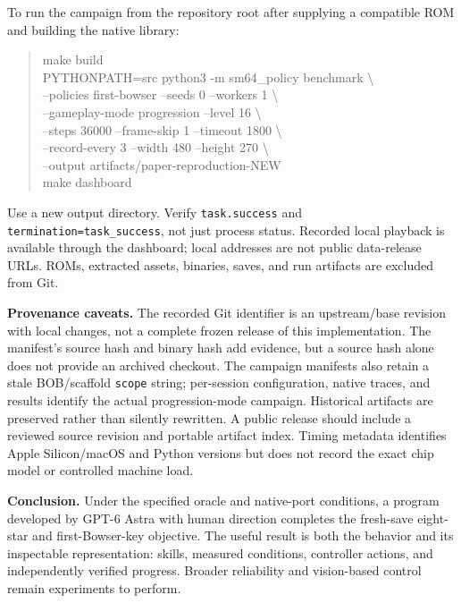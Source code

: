 \documentclass[10pt,letterpaper]{article}
\newcommand{\code}[1]{\texttt{#1}}
\begin{document}
To run the campaign from the repository root after supplying a compatible ROM and building the native library:
\begin{quote}\small\ttfamily
make build\\
PYTHONPATH=src python3 -m sm64\_policy benchmark \textbackslash\\
\hspace*{1em}--policies first-bowser --seeds 0 --workers 1 \textbackslash\\
\hspace*{1em}--gameplay-mode progression --level 16 \textbackslash\\
\hspace*{1em}--steps 36000 --frame-skip 1 --timeout 1800 \textbackslash\\
\hspace*{1em}--record-every 3 --width 480 --height 270 \textbackslash\\
\hspace*{1em}--output artifacts/paper-reproduction-NEW\\
make dashboard
\end{quote}
Use a new output directory. Verify \code{task.success} and \code{termination=task\_success}, not just process status. Recorded local playback is available through the dashboard; local addresses are not public data-release URLs. ROMs, extracted assets, binaries, saves, and run artifacts are excluded from Git.

\textbf{Provenance caveats.} The recorded Git identifier is an upstream/base revision with local changes, not a complete frozen release of this implementation. The manifest's source hash and binary hash add evidence, but a source hash alone does not provide an archived checkout. The campaign manifests also retain a stale BOB/scaffold \code{scope} string; per-session configuration, native traces, and results identify the actual progression-mode campaign. Historical artifacts are preserved rather than silently rewritten. A public release should include a reviewed source revision and portable artifact index. Timing metadata identifies Apple Silicon/macOS and Python versions but does not record the exact chip model or controlled machine load.

\textbf{Conclusion.} Under the specified oracle and native-port conditions, a program developed by GPT-6 Astra with human direction completes the fresh-save eight-star and first-Bowser-key objective. The useful result is both the behavior and its inspectable representation: skills, measured conditions, controller actions, and independently verified progress. Broader reliability and vision-based control remain experiments to perform.
\end{document}
